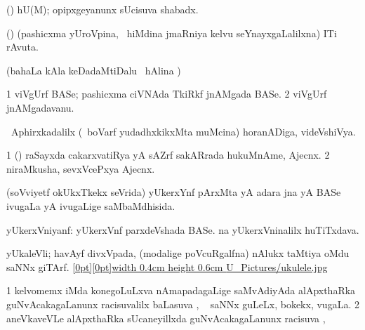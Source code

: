 {\bentry
{}
\gl{\saMkiSx}
\expl{}
\bmng
{} 
\emng
\eentry

\bentry
{} 
\bmng
\BAavayx (\AmA) hU(M); opipxgeyanunx sUcisuva shabadx. 
\emng
\eentry

\bentry
{} 
\gl{\nA}
\expl{}
\bmng
(\ca) (pashicxma yUroVpina, \kanmu\ hiMdina jmaRniya kelvu seYnayxgaLalilxna) ITi rAvuta. 
\emng
\eentry

\bentry
{}
\gl{\saMkiSx}
\expl{}
\bmng
(bahaLa kAla keDadaMtiDalu \kanmu\ hAlina \vi)  
\emng
\eentry

\bentry
{} 
\gl{\nA}
\expl{}
\bmng
\bnum
\num{1} viVgUrf BASe; pashicxma ciVNAda TkiRkf jnAMgada BASe. 
\num{2} viVgUrf jnAMgadavanu. 
\enum
\emng
\eentry

\bentry
{} 
\gl{\nA}
\expl{}
\bmng
\da\ Aphirxkadalilx (\kanmu\ boVarf  yudadhxkikxMta muMcina) horanADiga, videVshiVya. 
\emng
\eentry

\bentry
{}
\gl{\saMkiSx}
\expl{}
\bmng
{} 
\emng
\eentry

\bentry
{}
\gl{\saMkiSx}
\expl{}
\bmng
{} 
\emng
\eentry

\bentry
{} 
\gl{\nA}
\bmng
\bnum
\num{1} (\ca) raSayxda cakarxvatiRya yA sAZrf sakARrada hukuMnAme, Ajecnx. 
\num{2} niraMkusha, sevxVcePxya Ajecnx. 
\enum
\emng
\eentry

\bentry
{} 
\gl{\gu}
\expl{}
\bmng
(soVviyetf okUkxTkekx seVrida) yUkerxYnf pArxMta yA adara jna yA BASe ivugaLa yA ivugaLige saMbaMdhisida. 
\emng
\eentry

\bentry
{} 
\gl{\nA}
\expl{}
\bmng
\banum
{} yUkerxVniyanf: yUkerxVnf parxdeVshada BASe. 
  na yUkerxVninalilx huTiTxdava. 
\eanum
\emng
\eentry

\bentry
{} 
\gl{\nA}
\expl{}
\bmng
yUkaleVli; havAyf divxVpada, (modalige poVcuRgalfna) nAlukx taMtiya oMdu saNNx giTArf. \quad \hyperlink{ukulelefigure}{\raisebox{-0.15cm}[0pt][0pt]{\pdfimage width 0.4cm height 0.6cm {U_Pictures/ukulele.jpg}}} 
\emng
\eentry

\bentry
{} 
\gl{\uparx}
\expl{}
\bmng
\bnum
\num{1} kelvomemx  iMda konegoLuLxva nAmapadagaLige saMvAdiyAda alApxthaRka guNvAcakagaLanunx racisuvalilx baLasuva \uparx, \udA\  saNNx guLeLx, bokekx, \mo vugaLa. 
\num{2} aneVkaveVLe alApxthaRka sUcaneyillxda guNvAcakagaLanunx racisuva \uparx, \udA\  
\enum
\emng
\eentry

}
